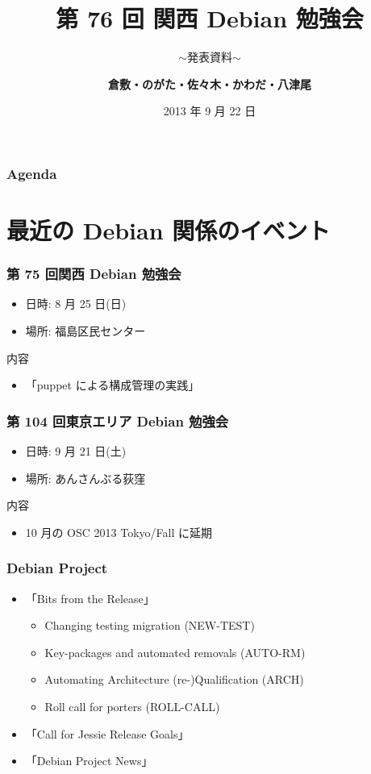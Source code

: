 \documentclass[cjk,dvipdfmx,10pt,compress,%
hyperref={bookmarks=true,bookmarksnumbered=true,bookmarksopen=false,%
colorlinks=false,%
pdftitle={第 76 回 関西 Debian 勉強会},%
pdfauthor={倉敷・のがた・佐々木・かわだ・八津尾},%
pdfsubject={資料},%
}]{beamer}
\title{第 76 回 関西 Debian 勉強会}
\subtitle{$\sim$発表資料$\sim$}
\author[かわだ てつたろう]{{\large\bf 倉敷・のがた・佐々木・かわだ・八津尾}}
\institute[Debian JP]{{\normalsize\tt 関西 Debian 勉強会}}
\date{{\small 2013 年 9 月 22 日}}
\begin{document}
\settitleslide
\begin{frame}
\titlepage
\end{frame}
\setdefaultslide

\begin{frame}[fragile]
\frametitle{Agenda}

\tableofcontents

\end{frame}

\section{最近の Debian 関係のイベント}


\begin{frame}[fragile]
  \frametitle{第 75 回関西 Debian 勉強会}
  \begin{itemize}
  \item 日時: 8 月 25 日(日)
  \item 場所: 福島区民センター
  \end{itemize}
  \begin{block}{内容}
    \begin{itemize}
    \item 「puppet による構成管理の実践」
    \end{itemize}
  \end{block}
\end{frame}

\begin{frame}[fragile]
  \frametitle{第 104 回東京エリア Debian 勉強会}
  \begin{itemize}
  \item 日時: 9 月 21 日(土)
  \item 場所: あんさんぶる荻窪
  \end{itemize}
  \begin{block}{内容}
    \begin{itemize}
    \item 10 月の OSC 2013 Tokyo/Fall に延期
    \end{itemize}
  \end{block}
\end{frame}

\begin{frame}[fragile]
  \frametitle{Debian Project}
  \begin{itemize}
  \item 「Bits from the Release」
    \begin{itemize}
    \item Changing testing migration (NEW-TEST)
    \item Key-packages and automated removals (AUTO-RM)
    \item Automating Architecture (re-)Qualification (ARCH)
    \item Roll call for porters (ROLL-CALL)
    \end{itemize}
  \item 「Call for Jessie Release Goals」
  \item 「Debian Project News」
  \end{itemize}
\end{frame}
\end{document}

